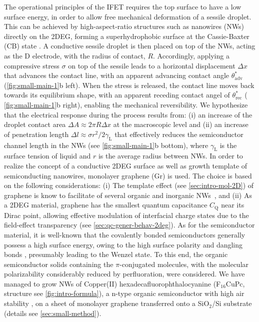 The operational principles of the IFET requires the top surface to
have a low surface energy, in order to allow free mechanical
deformation of a sessile droplet.
%
This can be achieved by high-aspect-ratio structures such as nanowires (NWs)~\autocite{Yang_2010_rev_NW} directly on the 2DEG,
forming a superhydrophobic surface at the Cassie-Baxter (CB) state
\autocite{Cassie_1944_wet}.
%
A conductive sessile droplet is then placed on top
of the NWs, acting as the D electrode, with the radius of contact,
\(R\).
%
Accordingly, applying a compressive stress \(\sigma\) on top
of the sessile leads to a horizontal displacement \(\Delta x\) that
advances the contact line, with an apparent advancing contact angle
\(\theta_{\mathrm{adv}}^{*}\) (\autoref{fig:small-main-1}b left).
%
When the
stress is released, the contact line moves back towards its
equilibrium shape, with an apparent receding contact angel of
\(\theta_{\mathrm{rec}}^{*}\) ( \autoref{fig:small-main-1}b right), enabling the
mechanical reversibility.
%
We hypothesize that the electrical response during the
process results from: (i) an increase of the droplet contact area
\(\Delta A \approx 2 \pi R \Delta x\) at the macroscopic level and (ii)
an increase of penetration length \(\Delta l \approx \sigma
r^{2}/2\gamma_{\mathrm{L}}\) that effectively reduces the semiconductor
channel length in the NWs (see \autoref{fig:small-main-1}b bottom), where
\(\gamma_{\mathrm{L}}\) is the surface tension of liquid and \(r\) is the
average radius between NWs.
%
In order to realize the concept of a conductive 2DEG surface as well
as growth template of semiconducting nanowires, monolayer graphene (Gr) is used.
%
The choice is based on the following considerations: (i) The template
effect (see \autoref{sec:intro-mol-2D}) of graphene is know to
facilitate of several organic and inorganic
NWs~\autocite{Huang_2016_laury_nanowire_gr,Wang_2015_vertical_nanowire_gr,Fu_2012_gr_ZnONW},
and (ii) As a 2DEG material, graphene has the smallest quantum
capacitance $C_{\mathrm{Q}}$ near its Dirac point, allowing effective
modulation of interfacial charge states due to the field-effect
transparency (see \autoref{sec:qc-gener-behav-2deg}).
%
As for the semiconductor material, it is well-known
that the covalently bonded semiconductors generally possess a high
surface energy, owing to the high surface polarity
\autocite{Azimi_2013_wetting_RO} and dangling bonds
\autocite{Zhang_2004_dangling}, presumably leading to the Wenzel state.
%
To
this end, the organic semiconductor solids containing the
\(\pi\)-conjugated molecules, with the molecular polarizability
considerably reduced by perfluoration, were considered.
%
We have managed to grow NWs of Copper(II) hexadeca\-fluoro\-phthalocyanine
(F\(_{\text{16}}\)CuPc, structure see \autoref{fig:intro-formula}), a
n-type organic semiconductor with high air stability
\autocite{Bao_1998_FCuPC}, on a sheet of monolayer graphene transferred
onto a SiO\(_{\text{2}}\)/Si substrate (details see
\autoref{sec:small-method}).


